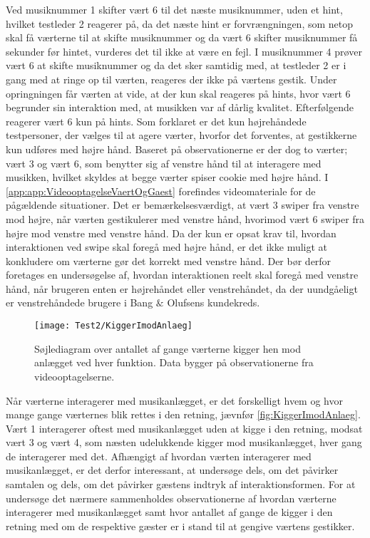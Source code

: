 Ved musiknummer 1 skifter vært 6 til det næste musiknummer, uden et hint, hvilket testleder 2 reagerer på, da det næste hint er forvrængningen, som netop skal få værterne til at skifte musiknummer og da vært 6 skifter musiknummer få sekunder før hintet, vurderes det til ikke at være en fejl. I musiknummer 4 prøver vært 6 at skifte musiknummer og da det sker samtidig med, at testleder 2 er i gang med at ringe op til værten, reageres der ikke på værtens gestik. Under opringningen får værten at vide, at der kun skal reageres på hints, hvor vært 6 begrunder sin interaktion med, at musikken var af dårlig kvalitet. Efterfølgende reagerer vært 6 kun på hints.\blankline
%
Som forklaret er det kun højrehåndede testpersoner, der vælges til at agere værter, hvorfor det forventes, at gestikkerne kun udføres med højre hånd. Baseret på observationerne er der dog to værter; vært 3 og vært 6, som benytter sig af venstre hånd til at interagere med musikken, hvilket skyldes at begge værter spiser cookie med højre hånd. I \autoref{app:app:VideooptagelseVaertOgGaest} forefindes videomateriale for de pågældende situationer. Det er bemærkelsesværdigt, at vært 3 swiper fra venstre mod højre, når værten gestikulerer med venstre hånd, hvorimod vært 6 swiper fra højre mod venstre med venstre hånd. Da der kun er opsat krav til, hvordan interaktionen ved swipe skal foregå med højre hånd, er det ikke muligt at konkludere om værterne gør det korrekt med venstre hånd. Der bør derfor foretages en undersøgelse af, hvordan interaktionen reelt skal foregå med venstre hånd, når brugeren enten er højrehåndet eller venstrehåndet, da der uundgåeligt er venstrehåndede brugere i Bang $\&$ Olufsens kundekreds.     
%
\begin{figure}[H]
	\centering
	\texttt{[image: Test2/KiggerImodAnlaeg]}
	\caption{Søjlediagram over antallet af gange værterne kigger hen mod anlægget ved hver funktion. Data bygger på observationerne fra videooptagelserne.}
	\label{fig:KiggerImodAnlaeg}
\end{figure}
\noindent
% 
Når værterne interagerer med musikanlægget, er det forskelligt hvem og hvor mange gange værternes blik rettes i den retning, jævnfør \autoref{fig:KiggerImodAnlaeg}. Vært 1 interagerer oftest med musikanlægget uden at kigge i den retning, modsat vært 3 og vært 4, som næsten udelukkende kigger mod musikanlægget, hver gang de interagerer med det. Afhængigt af hvordan værten interagerer med musikanlægget, er det derfor interessant, at undersøge dels, om det påvirker samtalen og dels, om det påvirker gæstens indtryk af interaktionsformen. For at undersøge det nærmere sammenholdes observationerne af hvordan værterne interagerer med musikanlægget samt hvor antallet af gange de kigger i den retning med om de respektive gæster er i stand til at gengive værtens gestikker. 


